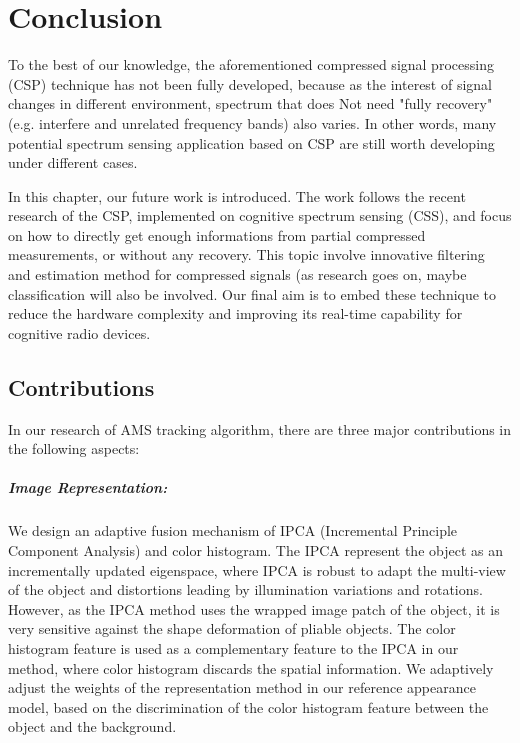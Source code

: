 \chapter{Conclusion}\label{C:conclusion}

\indent \indent To the best of our knowledge, the aforementioned compressed signal processing (CSP) technique has not been fully developed, because as the interest of signal changes in different environment, spectrum that does Not need "fully recovery" (e.g. interfere and unrelated frequency bands) also varies. In other words, many potential spectrum sensing application based on CSP are still worth developing under different cases. 

In this chapter, our future work is introduced. The work follows the recent research of the CSP, implemented on cognitive spectrum sensing (CSS), and focus on how to directly get enough informations from partial compressed measurements, or without any recovery. This topic involve innovative filtering and estimation method for compressed signals (as research goes on, maybe classification will also be involved. Our final aim is to embed these technique to reduce the hardware complexity and improving its real-time capability for cognitive radio devices. 

\section{Contributions}\label{sct:Contribution}
\indent \indent In our research of AMS tracking algorithm, there are three major contributions in the following aspects:

\paragraph{Image Representation:} We design an adaptive fusion mechanism of IPCA (Incremental Principle Component Analysis) and color histogram. The IPCA represent the object as an incrementally updated eigenspace, where IPCA is robust to adapt the multi-view of the object and distortions leading by illumination variations and rotations. However, as the IPCA method uses the wrapped image patch of the object, it is very sensitive against the shape deformation of pliable objects. The color histogram feature is used as a complementary feature to the IPCA in our method, where color histogram discards the spatial information. We adaptively adjust the weights of the representation method in our reference appearance model, based on the discrimination of the color histogram feature between the object and the background.

